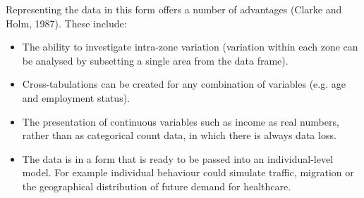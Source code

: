 \documentclass[a4paper,10pt]{article}
\begin{document}
Representing the data in this form offers a number of advantages
(Clarke and Holm, 1987). These include:
\begin{itemize}
 \item The ability to investigate intra-zone variation (variation within each zone can be analysed
 by subsetting a single area from the data frame).
\item Cross-tabulations can be created for any combination of variables (e.g. age and employment status).
\item The presentation of continuous variables such as income as real numbers, 
rather than as categorical count data, in which there is always data loss.
\item The data is in a form that is ready to be passed into an individual-level model.
For example individual behaviour could simulate traffic, migration or the geographical distribution of future demand for healthcare.
\end{itemize}

\end{document}
